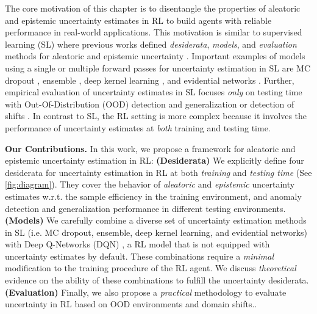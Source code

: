 The core motivation of this chapter is to disentangle the properties of aleatoric and epistemic uncertainty estimates in RL to build agents with reliable performance in real-world applications. This motivation is similar to supervised learning (SL) where previous works defined \emph{desiderata}, \emph{models}, and \emph{evaluation} methods for aleatoric and epistemic uncertainty \citep{uncertainty-deep-learning, review-uncertainty-dl, dataset-shift, robustness-uncertainty-dirichlet}. Important examples of models using a single or multiple forward passes for uncertainty estimation in SL are MC dropout \citep{dropout}, ensemble \citep{ensembles, hyper-ensembles, batch-ensembles}, deep kernel learning \citep{simple-baseline-uncertainty, due, duq, uceloss}, and evidential networks \citep{charpentier2020, PriorNetworks, natpn, evidential-regression}. Further, empirical evaluation of uncertainty estimates in SL focuses \emph{only} on testing time with Out-Of-Distribution (OOD) detection and generalization or detection of shifts \citep{dataset-shift, shifts-dataset}. In contrast to SL, the RL setting is more complex because it involves the performance of uncertainty estimates at \emph{both} training and testing time.

\textbf{Our Contributions.} In this work, we propose a framework for aleatoric and epistemic uncertainty estimation in RL: \textbf{(Desiderata)} We explicitly define four desiderata for uncertainty estimation in RL at both \emph{training} and \emph{testing time} (See \cref{fig:diagram}). They cover the behavior of \emph{aleatoric} and \emph{epistemic} uncertainty estimates w.r.t. the sample efficiency in the training environment, and anomaly detection and generalization performance in different testing environments. \textbf{(Models)} We carefully combine a diverse set of uncertainty estimation methods in SL (i.e. MC dropout, ensemble, deep kernel learning, and evidential networks) with Deep Q-Networks (DQN) \citep{dqn}, a RL model that is not equipped with uncertainty estimates by default. These combinations require a \emph{minimal} modification to the training procedure of the RL agent. We discuss \emph{theoretical} evidence on the ability of these combinations to fulfill the uncertainty desiderata. \textbf{(Evaluation)} Finally, we also propose a \emph{practical} methodology to evaluate uncertainty in RL based on OOD environments and domain shifts..
